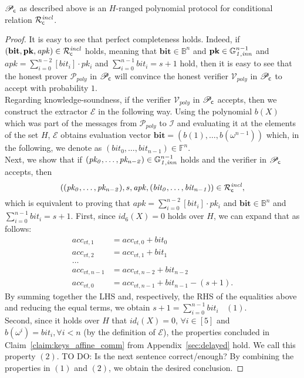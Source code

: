 \begin{lemma} $\mathscr{P}_{\mathsf{c}}$ as described above is an $H$-ranged polynomial protocol for conditional relation $\mathcal{R}^{\mathit{incl}}_{\mathsf{c}}$.
\end{lemma}

\begin{proof}
It is easy to see that perfect completeness holds. Indeed, if $(\mathbf{bit},\mathbf{pk}, \mathit{apk}) \in \mathcal{R}^{\mathit{incl}}_{\mathsf{c}}$ holds, 
meaning that $\mathbf{bit} \in \mathbb{B}^n$ and $\mathbf{pk} \in \mathbb{G}_{\mathit{1,inn}}^{n-1}$ and $\mathit{apk} = \sum_{i=0}^{n-2} [\mathit{bit_i}] \cdot \mathit{pk_i}$ and 
$\sum_{i=0}^{n-1} \mathit{bit_i} = s+1$ hold, then it is easy to see that the honest prover $\mathcal{P}_{poly}$ in $\mathscr{P}_{\mathsf{c}}$ will convince the honest 
verifier $\mathcal{V}_{poly}$ in $\mathscr{P}_{\mathsf{c}}$ to accept with probability $1$. \\
Regarding knowledge-soundness, if the verifier $\mathcal{V}_{poly}$ in $\mathscr{P}_{\mathsf{c}}$ accepts, 
then we construct the extractor $\mathcal{E}$ in the following way. Using the polynomial $b(X)$ which 
was part of the messages from $\mathcal{P}_{poly}$ to $\mathcal{I}$ and evaluating it at the elements of the set 
$H$, $\mathcal{E}$ obtains evaluation vector $\mathbf{bit} = (b(1), \ldots, b(\omega^{n-1}))$ which, 
in the following, we denote as $(\mathit{bit}_0, \ldots, \mathit{bit}_{n-1}) \in \mathbb{F}^n$.\\ 
\noindent Next, we show that if $(\mathit{pk_0}, \ldots, \mathit{pk_{n-2}}) \in \mathbb{G}_{\mathit{1,inn}}^{n-1}$ holds and the 
verifier in $\mathscr{P}_{\mathsf{c}}$ accepts, then 
$$((\mathit{pk_0}, \ldots, \mathit{pk_{n-2}}), s, \mathit{apk}, (\mathit{bit_0}, \ldots, \mathit{bit_{n-1}})) \in \mathcal{R}^{\mathit{incl}}_{\mathsf{c}},$$ 
which is equivalent to proving that $\mathit{apk} = \sum_{i=0}^{n-2} [\mathit{bit_i}]  \cdot \mathit{pk_i}$ and 
$\mathbf{bit} \in \mathbb{B}^n$ and  $\sum_{i=0}^{n-1} \mathit{bit_i} = s+1$.
\noindent First, since $id_6(X) = 0$ holds over $H$, we can expand that as follows:
\begin{align*}
acc_{vt,1} &= acc_{vt,0} + \mathit{bit}_{0} \\
acc_{vt, 2} &= acc_{vt,1} + \mathit{bit}_{1} \\
\ldots \\
acc_{vt,n-1} &= acc_{vt,n-2} + \mathit{bit}_{n-2} \\
acc_{vt,0} &= acc_{vt,n-1} + \mathit{bit}_{n-1} - (s+1).
\end{align*}
\noindent By summing together the LHS and, respectively, the RHS of the equalities above and 
reducing the equal terms, we obtain $s+1 = \sum_{i=0}^{n-1}\mathit{bit}_i \ \ \ \ (1)$. \\ 
Second, since it holds over $H$ that $id_i(X) = 0$, $\forall i \in [5]$ and $b(\omega^i) = \mathit{bit_i}, \forall i<n$ (by the definition 
of $\mathcal{E}$), the properties concluded in Claim~\ref{claim:keys_affine_comm} from Appendix~\ref{sec:delayed} hold. We call this property $(2)$.
{\color{red} TO DO: Is the next sentence correct/enough? By combining the properties in $(1)$ and $(2)$, we obtain the desired conclusion.}
\end{proof}

